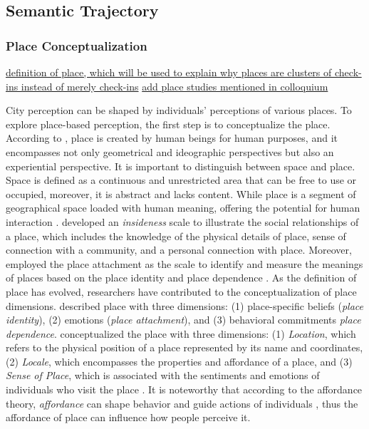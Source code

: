 \documentclass{article}
\theoremstyle{remark}
\begin{document}
\subsection{Semantic Trajectory} \label{semantic_trajectory}

\subsubsection{Place Conceptualization}
\underline{definition of place, which will be used to explain why places are clusters of check-ins instead of merely check-ins}
\underline{add place studies mentioned in colloquium}

City perception can be shaped by individuals' perceptions of various places. To explore place-based perception, the first step is to conceptualize the place. According to \cite{tuan_place_1975}, place is created by human beings for human purposes, and it encompasses not only geometrical and ideographic perspectives but also an experiential perspective. It is important to distinguish between space and place. Space is defined as a continuous and unrestricted area that can be free to use or occupied, moreover, it is abstract and lacks content. While place is a segment of geographical space loaded with human meaning, offering the potential for human interaction \citep{tuan_place_1975, agnew_space_2011, cresswell_place_2014}. \cite{relph_place_1976} developed an \textit{insideness} scale to illustrate the social relationships of a place, which includes the knowledge of the physical details of place, sense of connection with a community, and a personal connection with place. Moreover, \cite{williams_measurement_2003} employed the place attachment \citep{altman_place_1992} as the scale to identify and measure the meanings of places based on the place identity \citep{proshansky_city_1978,proshansky_place_1983} and place dependence \citep{stokols_people_1981}. As the definition of place has evolved, researchers have contributed to the conceptualization of place dimensions. \cite{jorgensen_comparative_2006} described place with three dimensions: (1) place-specific beliefs (\textit{place identity}), (2) emotions (\textit{place attachment}), and (3) behavioral commitments \textit{place dependence}. \cite{agnew_space_2011} conceptualized the place with three dimensions: (1) \textit{Location}, which refers to the physical position of a place represented by its name and coordinates, (2) \textit{Locale}, which encompasses the properties and affordance of a place, and (3) \textit{Sense of Place}, which is associated with the sentiments and emotions of individuals who visit the place \citep{bahrehdar_description_2018}. It is noteworthy that according to the affordance theory, \textit{affordance} can shape behavior and guide actions of individuals \citep{gibson_theory_1977}, thus the affordance of place can influence how people perceive it. 
\end{document}
